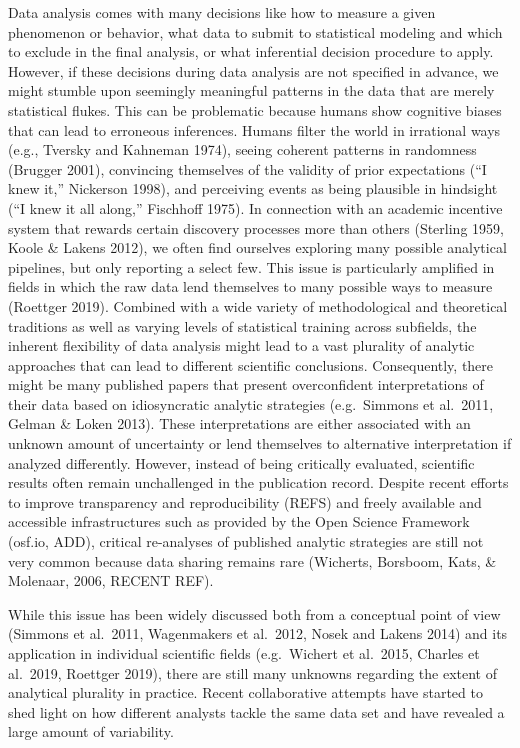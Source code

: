 \documentclass[
  english,
  man,floatsintext]{apa6}
\begin{document}
Data analysis comes with many decisions like how to measure a given phenomenon or behavior, what data to submit to statistical modeling and which to exclude in the final analysis, or what inferential decision procedure to apply.
However, if these decisions during data analysis are not specified in advance, we might stumble upon seemingly meaningful patterns in the data that are merely statistical flukes.
This can be problematic because humans show cognitive biases that can lead to erroneous inferences.
Humans filter the world in irrational ways (e.g., Tversky and Kahneman 1974), seeing coherent patterns in randomness (Brugger 2001), convincing themselves of the validity of prior expectations (``I knew it,'' Nickerson 1998), and perceiving events as being plausible in hindsight (``I knew it all along,'' Fischhoff 1975).
In connection with an academic incentive system that rewards certain discovery processes more than others (Sterling 1959, Koole \& Lakens 2012), we often find ourselves exploring many possible analytical pipelines, but only reporting a select few.
This issue is particularly amplified in fields in which the raw data lend themselves to many possible ways to measure (Roettger 2019).
Combined with a wide variety of methodological and theoretical traditions as well as varying levels of statistical training across subfields, the inherent flexibility of data analysis might lead to a vast plurality of analytic approaches that can lead to different scientific conclusions.
Consequently, there might be many published papers that present overconfident interpretations of their data based on idiosyncratic analytic strategies (e.g.~Simmons et al.~2011, Gelman \& Loken 2013).
These interpretations are either associated with an unknown amount of uncertainty or lend themselves to alternative interpretation if analyzed differently.
However, instead of being critically evaluated, scientific results often remain unchallenged in the publication record.
Despite recent efforts to improve transparency and reproducibility (REFS) and freely available and accessible infrastructures such as provided by the Open Science Framework (osf.io, ADD), critical re-analyses of published analytic strategies are still not very common because data sharing remains rare (Wicherts, Borsboom, Kats, \& Molenaar, 2006, RECENT REF).

While this issue has been widely discussed both from a conceptual point of view (Simmons et al.~2011, Wagenmakers et al.~2012, Nosek and Lakens 2014) and its application in individual scientific fields (e.g.~Wichert et al.~2015, Charles et al.~2019, Roettger 2019), there are still many unknowns regarding the extent of analytical plurality in practice.
Recent collaborative attempts have started to shed light on how different analysts tackle the same data set and have revealed a large amount of variability.
\end{document}
